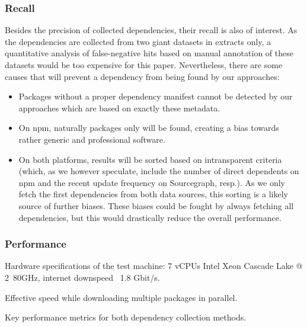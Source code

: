 \subsubsection{Recall}
\label{sec:evaluation/resqu1/recall}

Besides the precision of collected dependencies, their recall is also of interest.
As the dependencies are collected from two giant datasets in extracts only, a quantitative analysis of false-negative hits based on manual annotation of these datasets would be too expensive for this paper.
Nevertheless, there are some causes that will prevent a dependency from being found by our approaches:

\begin{itemize}
	\item Packages without a proper dependency manifest cannot be detected by our approaches which are based on exactly these metadata.
	\item On npm, naturally packages only will be found, creating a bias towards rather generic and professional software.
	\item On both platforms, results will be sorted based on intransparent criteria (which, as we however speculate, include the number of direct dependents on npm and the recent update frequency on Sourcegraph, resp.).
		As we only fetch the first dependencies from both data sources, this sorting is a likely source of further biases.
		These biases could be fought by always fetching all dependencies, but this would drastically reduce the overall performance.
\end{itemize}

\subsubsection{Performance}
\label{sec:evaluation/resqu1/performance}

\begin{table}
	\centering
	\small
	\begin{threeparttable}
		
		\begin{tablenotes}
			\footnotesize
			\item[\alphtnotetext{1}] Hardware specifications of the test machine: 7 vCPUs Intel Xeon Cascade Lake @ \si{2.80}{GHz}, internet downspeed ~1.8 \si{Gbit}/\si{s}.
			\item[\alphtnotetext{2}] Effective speed while downloading multiple packages in parallel.
		\end{tablenotes}
	\end{threeparttable}

	\caption{Key performance metrics for both dependency collection methods.}
	\label{tab:evaluation/resqu1/performance}
\end{table}

